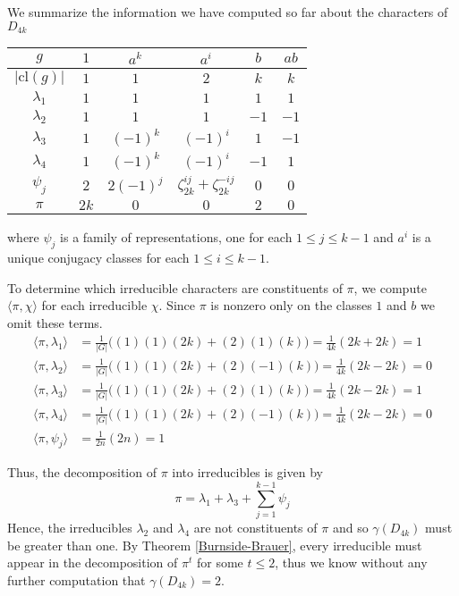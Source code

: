 We summarize the information we have computed so far about the characters of $D_{4k}$

\def\cl{\text{cl}}
\begin{center}
\begin{tabular}{c|ccccc}
    $g$ &$1$ & $a^k$ & $a^i$ & $b$ & $ab$ \\ \hline
    $|\cl(g)|$ & $1$ & $1$ & $2$ & $k$ & $k$ \\ \hline
%
    $\lambda_1$ & $1$ & $1$ & $1$ & $1$ & $1$ \\
    $\lambda_2$ & $1$ & $1$ & $1$ & $-1$ & $-1$ \\
    $\lambda_3$ & $1$ & $(-1)^k$ & $(-1)^i$ & $1$ & $-1$ \\
    $\lambda_4$ & $1$ & $(-1)^k$ & $(-1)^i$ & $-1$ & $1$ \\
    $\psi_j$ & $2$ & $2(-1)^j$ & $\zeta_{2k}^{ij} + \zeta_{2k}^{-ij}$ & $0$ & $0$ \\ \hline
    $\pi$ & $2k$ & $0$ & $0$ & $2$ & $0$ 
\end{tabular}
\end{center}
where $\psi_j$ is a family of representations, one for each $1 \leq j \leq k-1$ and $a^i$ is a unique conjugacy 
classes for each $1 \leq i \leq k-1$.

To determine which irreducible characters are constituents of $\pi$, we compute $\langle \pi, \chi\rangle$ for each 
irreducible $\chi$.  Since $\pi$ is nonzero only on the classes $1$ and $b$ we omit these terms.
\begin{align*}
    \langle \pi, \lambda_1 \rangle &= \frac{1}{|G|}\bigg( (1)(1)(2k) + (2)(1)(k) \bigg)  = \frac{1}{4k}(2k + 2k) = 
    1 \\
%
    \langle \pi, \lambda_2 \rangle &= \frac{1}{|G|}\bigg( (1)(1)(2k) + (2)(-1)(k) \bigg)  = \frac{1}{4k}(2k - 2k) = 
    0 \\
%
    \langle \pi, \lambda_3 \rangle &= \frac{1}{|G|}\bigg( (1)(1)(2k) + (2)(1)(k) \bigg)  = \frac{1}{4k}(2k - 2k) = 
    1 \\
%
    \langle \pi, \lambda_4 \rangle &= \frac{1}{|G|}\bigg( (1)(1)(2k) + (2)(-1)(k) \bigg)  = \frac{1}{4k}(2k - 2k) = 
    0 \\
    \langle \pi, \psi_j \rangle &= \frac{1}{2n}(2n) = 1 
\end{align*}

Thus, the decomposition of $\pi$ into irreducibles is given by
\[
    \pi = \lambda_1 + \lambda_3 + \sum_{j=1}^{k-1} \psi_j
\]
Hence, the irreducibles $\lambda_2$ and $\lambda_4$ are not constituents of $\pi$ and so $\gamma(D_{4k})$ must be 
greater than one. By Theorem \ref{Burnside-Brauer}, every irreducible must appear in the decomposition of $\pi^t$ 
for some $t \leq 2$, thus we know without any further computation that $\gamma(D_{4k}) = 2$.



